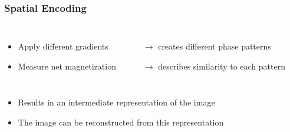 %	
%		
%		
%	
%	
%		
%		

\begin{frame}
	\frametitle{Spatial Encoding}
	
	\begin{columns}[onlytextwidth,c]
		{\small
		\begin{itemize}
			\item Apply different gradients
			\item Measure net magnetization
		\end{itemize}}
		{\small
		\begin{itemize}
			\item[$\rightarrow$] creates different phase patterns
			\item[$\rightarrow$] describes similarity to each pattern
		\end{itemize}}
	\end{columns}
	\begin{center}
		
	\end{center}
	
	\vspace{-2ex}
	
	\begin{itemize}
		\item Results in an intermediate representation of the image
		\item The image can be reconstructed from this representation
	\end{itemize}
\end{frame}

